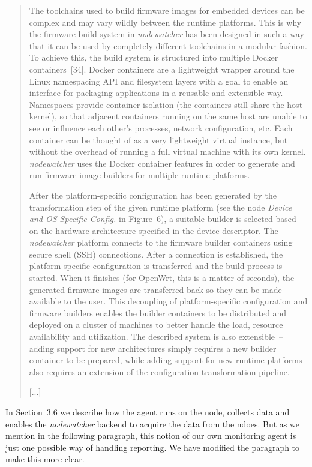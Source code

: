 \documentclass[12pt,twoside,a4paper]{report}
\newcommand{\nodewatcher}{\textit{nodewatcher}}
\begin{document}
\begin{quote}
The toolchains used to build firmware images for embedded devices can be complex and may vary wildly between the runtime platforms.
This is why the firmware build system in \nodewatcher{} has been designed in such a way that it can be used by completely different toolchains in a modular fashion.
To achieve this, the build system is structured into multiple Docker containers~[34].
Docker containers are a lightweight wrapper around the Linux namespacing API and filesystem layers with a goal to enable an interface for packaging applications in a reusable and extensible way.
Namespaces provide container isolation (the containers still share the host kernel), so that adjacent containers running on the same host are unable to see or influence each other's processes, network configuration, etc.
Each container can be thought of as a very lightweight virtual instance, but without the overhead of running a full virtual machine with its own kernel.
\nodewatcher{} uses the Docker container features in order to generate and run firmware image builders for multiple runtime platforms.

After the platform-specific configuration has been generated by the transformation step of the given runtime platform (see the node \textit{Device and OS Specific Config.} in Figure~6), a suitable builder is selected based on the hardware architecture specified in the device descriptor.
The \nodewatcher{} platform connects to the firmware builder containers using secure shell (SSH) connections.
After a connection is established, the platform-specific configuration is transferred and the build process is started.
When it finishes (for OpenWrt, this is a matter of seconds), the generated firmware images are transferred back so they can be made available to the user.
This decoupling of platform-specific configuration and firmware builders enables the builder containers to be distributed and deployed on a cluster of machines to better handle the load, resource availability and utilization.
The described system is also extensible~-- adding support for new architectures simply requires a new builder container to be prepared, while adding support for new runtime platforms also requires an extension of the configuration transformation pipeline.

[...]
\end{quote}

 In Section~3.6 we describe how the agent runs on the node, collects data and enables the \nodewatcher{} backend to acquire the data from the ndoes.
But as we mention in the following paragraph, this notion of our own monitoring agent is just one possible way of handling reporting.
We have modified the paragraph to make this more clear.
\end{document}
